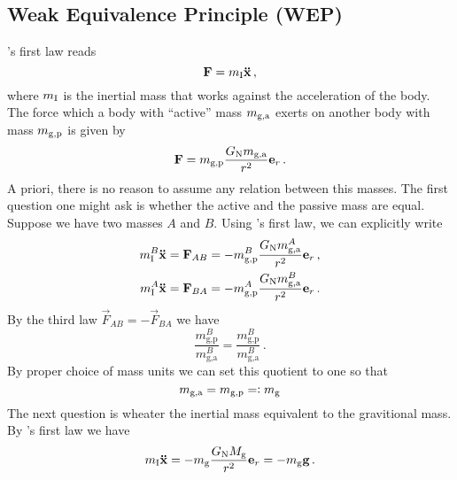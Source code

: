 \subsection*{Weak Equivalence Principle (WEP)}
's first law reads
\begin{equation}
    \vec{F}=m\textsubscript{I} \vec{\ddot{x}} \, ,
\end{equation}
where $m\textsubscript{I}$ is the inertial mass that works against the acceleration of the body.
The force which a body with ``active'' mass $m\textsubscript{g,a}$ exerts on
another body with mass $m\textsubscript{g,p}$ is given by 
\begin{equation}
    \vec{F}=m\textsubscript{g,p}\frac{G\textsubscript{N}m\textsubscript{g,a}}{r^2}\vec{e}_r \, .
\end{equation}
A priori, there is no reason to assume any relation between this masses.
The first question one might ask is whether the active and the passive mass are equal.
Suppose we have two masses $A$ and $B$. Using 's first law, we
can explicitly write
\begin{align}
    m^{B}_{\text{I}}\vec{\ddot{x}}&=\vec{F}_{AB}=-
    m^{B}_{\text{g,p}}\frac{G\textsubscript{N}m^{A}_{\text{g,a}}}{r^2}\vec{e}_r
    \, ,\\
    m^{A}_{\text{I}}\vec{\ddot{x}}&=\vec{F}_{BA}=-
    m^{A}_{\text{g,p}}\frac{G\textsubscript{N}m^{B}_{\text{g,a}}}{r^2}\vec{e}_r
    \, .
\end{align}
By the third law $\vec{F}_{AB}=-\vec{F}_{BA}$ we have
\begin{equation}
\frac{m^{B}_{\text{g,p}}}{m^{B}_{\text{g,a}}}=\frac{m^{B}_{\text{g,p}}}{m^{B}_{\text{g,a}}}\,.
\end{equation}
By proper choice of mass units we can set this quotient to one so that 
\begin{equation}
m\textsubscript{g,a}=m\textsubscript{g,p}=:m\textsubscript{g}
\end{equation}
The next question is wheater the inertial mass equivalent to the gravitional
mass.
By 's first law we have
\begin{equation}
m\textsubscript{I}\vec{\ddot{x}}
=-m_{\text{g}}\frac{G\textsubscript{N}M_{\text{g}}}{r^2}\vec{e}_r 
=-m_{\text{g}}\vec{g}\,.
\end{equation}
